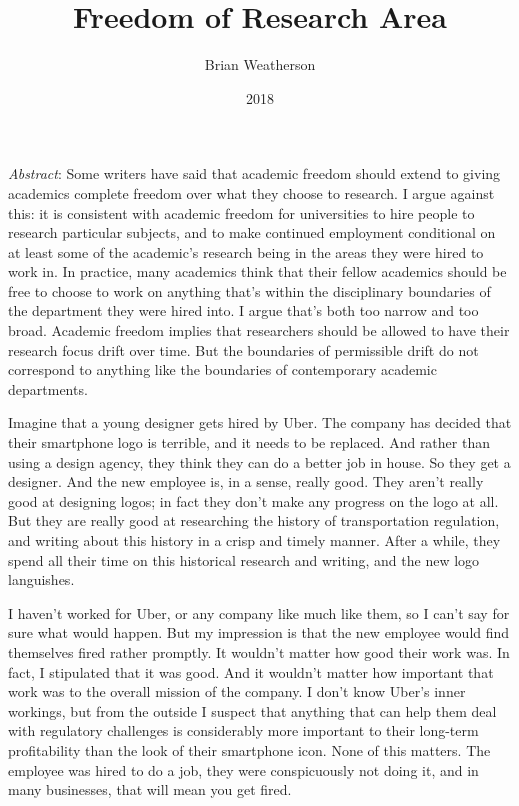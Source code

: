 \documentclass[
  11pt,
  letterpaper,
  DIV=11,
  numbers=noendperiod,
  twoside]{scrartcl}
\title{Freedom of Research Area}
\author{Brian Weatherson}
\date{2018}
\renewenvironment{abstract}
 {\vspace{-1.25cm}
 \quotation\small\noindent\emph{Abstract}:}
 {\endquotation}
\renewenvironment{abstract}
 {\quotation\small\noindent\emph{Abstract}:}
 {\endquotation\vspace{-0.02cm}}
\begin{document}
\maketitle
\begin{abstract}
Some writers have said that academic freedom should extend to giving
academics complete freedom over what they choose to research. I argue
against this: it is consistent with academic freedom for universities to
hire people to research particular subjects, and to make continued
employment conditional on at least some of the academic's research being
in the areas they were hired to work in. In practice, many academics
think that their fellow academics should be free to choose to work on
anything that's within the disciplinary boundaries of the department
they were hired into. I argue that's both too narrow and too broad.
Academic freedom implies that researchers should be allowed to have
their research focus drift over time. But the boundaries of permissible
drift do not correspond to anything like the boundaries of contemporary
academic departments.
\end{abstract}


Imagine that a young designer gets hired by Uber. The company has
decided that their smartphone logo is terrible, and it needs to be
replaced. And rather than using a design agency, they think they can do
a better job in house. So they get a designer. And the new employee is,
in a sense, really good. They aren't really good at designing logos; in
fact they don't make any progress on the logo at all. But they are
really good at researching the history of transportation regulation, and
writing about this history in a crisp and timely manner. After a while,
they spend all their time on this historical research and writing, and
the new logo languishes.

I haven't worked for Uber, or any company like much like them, so I
can't say for sure what would happen. But my impression is that the new
employee would find themselves fired rather promptly. It wouldn't matter
how good their work was. In fact, I stipulated that it was good. And it
wouldn't matter how important that work was to the overall mission of
the company. I don't know Uber's inner workings, but from the outside I
suspect that anything that can help them deal with regulatory challenges
is considerably more important to their long-term profitability than the
look of their smartphone icon. None of this matters. The employee was
hired to do a job, they were conspicuously not doing it, and in many
businesses, that will mean you get fired.
\end{document}

